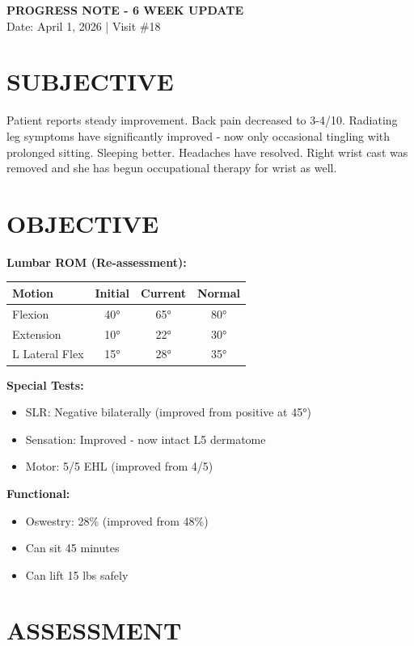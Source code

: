 \documentclass[11pt]{article}
\begin{document}
\begin{center}
{\Large\bfseries PROGRESS NOTE - 6 WEEK UPDATE}\\
{\normalsize Date: April 1, 2026 | Visit \#18}
\end{center}

\vspace{1em}

\section*{SUBJECTIVE}

Patient reports steady improvement. Back pain decreased to 3-4/10. Radiating leg symptoms have significantly improved - now only occasional tingling with prolonged sitting. Sleeping better. Headaches have resolved. Right wrist cast was removed and she has begun occupational therapy for wrist as well.

\section*{OBJECTIVE}

\textbf{Lumbar ROM (Re-assessment):}
\begin{tabular}{@{}lccc@{}}
\toprule
\textbf{Motion} & \textbf{Initial} & \textbf{Current} & \textbf{Normal} \\
\midrule
Flexion & 40° & 65° & 80° \\
Extension & 10° & 22° & 30° \\
L Lateral Flex & 15° & 28° & 35° \\
\bottomrule
\end{tabular}

\textbf{Special Tests:}
\begin{itemize}[nosep]
\item SLR: Negative bilaterally (improved from positive at 45°)
\item Sensation: Improved - now intact L5 dermatome
\item Motor: 5/5 EHL (improved from 4/5)
\end{itemize}

\textbf{Functional:}
\begin{itemize}[nosep]
\item Oswestry: 28\% (improved from 48\%)
\item Can sit 45 minutes
\item Can lift 15 lbs safely
\end{itemize}

\section*{ASSESSMENT}
\end{document}
